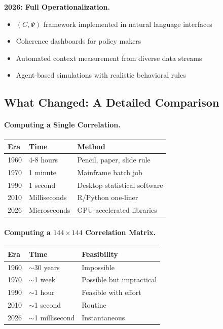 \textbf{2026: Full Operationalization.}
\begin{itemize}
  \item $(C, \Psi)$ framework implemented in natural language interfaces
  \item Coherence dashboards for policy makers
  \item Automated context measurement from diverse data streams
  \item Agent-based simulations with realistic behavioral rules
\end{itemize}

\subsection{What Changed: A Detailed Comparison}

\paragraph{Computing a Single Correlation.}
\begin{center}
\renewcommand{\arraystretch}{1.3}
\begin{tabular}{lll}
\hline
\textbf{Era} & \textbf{Time} & \textbf{Method} \\
\hline
1960 & 4-8 hours & Pencil, paper, slide rule \\
1970 & 1 minute & Mainframe batch job \\
1990 & 1 second & Desktop statistical software \\
2010 & Milliseconds & R/Python one-liner \\
2026 & Microseconds & GPU-accelerated libraries \\
\hline
\end{tabular}
\end{center}

\paragraph{Computing a $144 \times 144$ Correlation Matrix.}
\begin{center}
\renewcommand{\arraystretch}{1.3}
\begin{tabular}{lll}
\hline
\textbf{Era} & \textbf{Time} & \textbf{Feasibility} \\
\hline
1960 & $\sim$30 years & Impossible \\
1970 & $\sim$1 week & Possible but impractical \\
1990 & $\sim$1 hour & Feasible with effort \\
2010 & $\sim$1 second & Routine \\
2026 & $\sim$1 millisecond & Instantaneous \\
\hline
\end{tabular}
\end{center}

